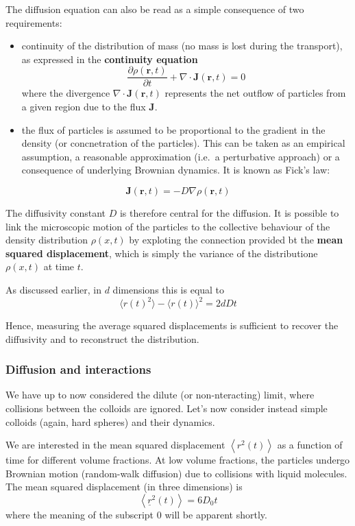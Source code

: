 \documentclass[
  letterpaper,
  enabledeprecatedfontcommands]{report}
\begin{document}
The diffusion equation can also be read as a simple consequence of two
requirements:

\begin{itemize}
\item
  continuity of the distribution of mass (no mass is lost during the
  transport), as expressed in the \textbf{continuity equation} \[
  \frac{\partial \rho(\mathbf{r}, t)}{\partial t} + \nabla \cdot \mathbf{J}(\mathbf{r}, t) = 0
  \] where the divergence \(\nabla \cdot \mathbf{J}(\mathbf{r}, t)\)
  represents the net outflow of particles from a given region due to the
  flux \(\mathbf{J}\).
\item
  the flux of particles is assumed to be proportional to the gradient in
  the density (or concnetration of the particles). This can be taken as
  an empirical assumption, a reasonable approximation (i.e.~a
  perturbative approach) or a consequence of underlying Brownian
  dynamics. It is known as Fick's law:
\end{itemize}

\[
\mathbf{J}(\mathbf{r}, t) = -D \nabla \rho(\mathbf{r}, t)
\]

The diffusivity constant \(D\) is therefore central for the diffusion.
It is possible to link the microscopic motion of the particles to the
collective behaviour of the density distribution \(\rho(x,t)\) by
exploting the connection provided bt the \textbf{mean squared
displacement}, which is simply the variance of the distributione
\(\rho(x,t)\) at time \(t\).

As discussed earlier, in \(d\) dimensions this is equal to
\[\langle r(t)^2\rangle-\langle r(t)\rangle^2 = 2d D t\]

Hence, measuring the average squared displacements is sufficient to
recover the diffusivity and to reconstruct the distribution.

\subsubsection{Diffusion and
interactions}\label{diffusion-and-interactions}

We have up to now considered the dilute (or non-nteracting) limit, where
collisions between the colloids are ignored. Let's now consider instead
simple colloids (again, hard spheres) and their dynamics.

We are interested in the mean squared displacement
\(\left\langle r^{2}(t)\right\rangle\) as a function of time for
different volume fractions. At low volume fractions, the particles
undergo Brownian motion (random-walk diffusion) due to collisions with
liquid molecules. The mean squared displacement (in three dimensions) is
\[\left\langle\underline{r}^{2}(t)\right\rangle=6 D_{0} t\] where the
meaning of the subscript 0 will be apparent shortly.
\end{document}

